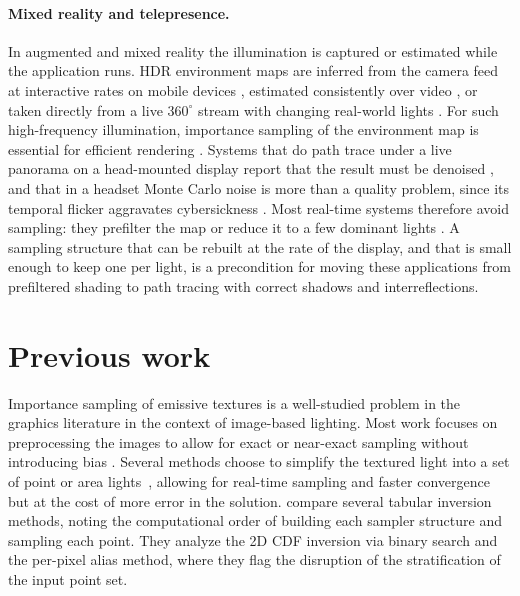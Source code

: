\documentclass[acmtog,review]{acmart}
\begin{document}
{\paragraph{Mixed reality and telepresence.}
In augmented and mixed reality the illumination is captured
or estimated while the application runs. HDR environment maps are inferred from the
camera feed at interactive rates on mobile devices
\cite{legendre2019deeplight,somanath2021hdr,zhao2021xihe}, estimated consistently over
video \cite{li2023spatiotemporally,shen2025stglight,bolduc2026limo}, or taken directly
from a live $360^\circ$ stream with changing real-world lights
\cite{rhee2017mr360,rhee2018mr360live,walton2018dynamic}. For such high-frequency
illumination, importance sampling of the environment map is essential for efficient
rendering \cite{kronander2015photorealistic,alhakamy2020realtime}. Systems that do
path trace under a live panorama on a head-mounted display report that the result must
be denoised \cite{cheng2023environment,wu2024panoramic}, and that in a headset Monte
Carlo noise is more than a quality problem, since its temporal flicker aggravates
cybersickness \cite{taibo2024immersive}. Most real-time systems therefore avoid
sampling: they prefilter the map or reduce it to a few dominant lights \cite{saito2024relightable}. A sampling structure that can be rebuilt at
the rate of the display, and that is small enough to keep one per light, is a
precondition for moving these applications from prefiltered shading to path tracing
with correct shadows and interreflections.
}
\section{Previous work}\label{sec:prev}
Importance sampling of emissive textures is a well-studied problem in the graphics literature in the context of image-based lighting. Most work focuses on preprocessing the images to allow for exact or near-exact sampling without introducing bias \cite{lawrence2005adaptive}. Several methods choose to simplify the textured light into a set of point or area lights~\cite{agarwal2003structured}, allowing for real-time sampling and faster convergence but at the cost of more error in the solution. \cite{cline2009tabular} compare several tabular inversion methods, noting the computational order of building each sampler structure and sampling each point. They analyze the 2D CDF inversion via binary search and the per-pixel alias method, where they flag the disruption of the stratification of the input point set. 
\end{document}
